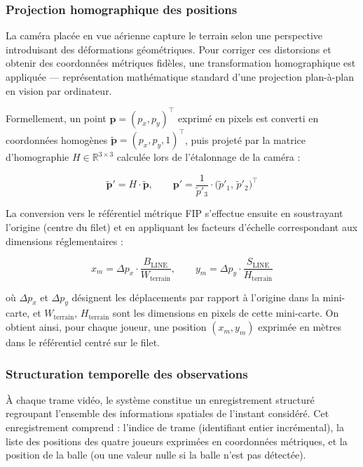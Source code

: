 \subsubsection{Projection homographique des positions}

La caméra placée en vue aérienne capture le terrain selon une perspective introduisant des
déformations géométriques. Pour corriger ces distorsions et obtenir des coordonnées métriques
fidèles, une transformation homographique est appliquée — représentation mathématique standard
d'une projection plan-à-plan en vision par ordinateur.

Formellement, un point $\mathbf{p} = (p_x, p_y)^\top$ exprimé en pixels est converti en
coordonnées homogènes $\tilde{\mathbf{p}} = (p_x, p_y, 1)^\top$, puis projeté par la matrice
d'homographie $H \in \mathbb{R}^{3 \times 3}$ calculée lors de l'étalonnage de la caméra :

\begin{equation}
  \tilde{\mathbf{p}}' = H \cdot \tilde{\mathbf{p}}, \qquad
  \mathbf{p}' = \frac{1}{\tilde{p}'_3} \cdot \bigl(\tilde{p}'_1,\, \tilde{p}'_2\bigr)^\top
  \label{eq:homographie}
\end{equation}

La conversion vers le référentiel métrique FIP s'effectue ensuite en soustrayant l'origine
(centre du filet) et en appliquant les facteurs d'échelle correspondant aux dimensions
réglementaires :

\begin{equation}
  x_m = \Delta p_x \cdot \frac{B_{\mathrm{LINE}}}{W_{\mathrm{terrain}}}, \qquad
  y_m = \Delta p_y \cdot \frac{S_{\mathrm{LINE}}}{H_{\mathrm{terrain}}}
  \label{eq:conversion_metrique}
\end{equation}

où $\Delta p_x$ et $\Delta p_y$ désignent les déplacements par rapport à l'origine dans la
mini-carte, et $W_{\mathrm{terrain}}$, $H_{\mathrm{terrain}}$ sont les dimensions en pixels
de cette mini-carte. On obtient ainsi, pour chaque joueur, une position $(x_m, y_m)$
exprimée en mètres dans le référentiel centré sur le filet.

\subsubsection{Structuration temporelle des observations}

À chaque trame vidéo, le système constitue un enregistrement structuré regroupant l'ensemble
des informations spatiales de l'instant considéré. Cet enregistrement comprend : l'indice de
trame (identifiant entier incrémental), la liste des positions des quatre joueurs exprimées en
coordonnées métriques, et la position de la balle (ou une valeur nulle si la balle n'est pas
détectée).

